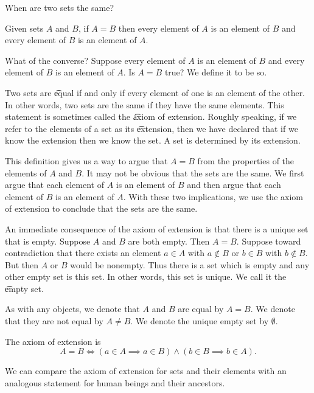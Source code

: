 

When are two sets the same?


Given sets $A$ and $B$, if $A = B$ then every element of $A$ is an element of $B$ and every element of $B$ is an element of $A$.

What of the converse?
Suppose every element of $A$ is an element of $B$ and every element of $B$ is an element of $A$.
Is $A = B$ true?
We define it to be so.

Two sets are \t{equal} if and only if every element of one is an element of the other.
In other words, two sets are the same if they have the same elements.
This statement is sometimes called the \t{axiom of extension}.
Roughly speaking, if we refer to the elements of a set as its \t{extension}, then we have declared that if we know the extension then we know the set.
A set is determined by its extension.

This definition gives us a way to argue that $A = B$ from the properties of the elements of $A$ and $B$.
It may not be obvious that the sets are the same.
We first argue that each element of $A$ is an element of $B$ and then argue that each element of $B$ is an element of $A$.
With these two implications, we use the axiom of extension to conclude that the sets are the same.

An immediate consequence of the axiom of extension is that there is a unique set that is empty.
Suppose $A$ and $B$ are both empty.
Then $A = B$.
Suppose toward contradiction that there exists an element $a \in A$ with $a \not\in B$ or $b \in B$ with $b \not\in B$.
But then $A$ or $B$ would be nonempty.
Thus there is a set which is empty and any other empty set is this set.
In other words, this set is unique.
We call it the \t{empty set}.


As with any objects, we denote that $A$ and $B$ are equal
by $A = B$.
We denote that they are not equal by $A \neq B$.
We denote the unique empty set by $\emptyset$.


The axiom of extension is
\[
  A = B \Leftrightarrow (a \in A \implies a \in B) \land (b \in B \implies b \in A).
\]



We can compare the axiom of extension
for sets and their elements with an
analogous statement
for human beings and their ancestors.

